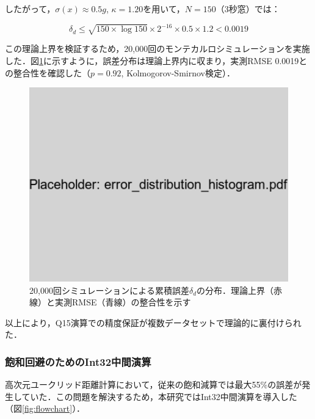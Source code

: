 \documentclass[paper]{ieicej}
\begin{document}
したがって，$\sigma(x) \approx 0.5g$, $\kappa = 1.20$を用いて，$N=150$（3秒窓）では：

\begin{equation}
\delta_d \leq \sqrt{150 \times \log 150} \times 2^{-16} \times 0.5 \times 1.2 < 0.0019
\end{equation}

この理論上界を検証するため，20,000回のモンテカルロシミュレーションを実施した．図\ref{fig:error_distribution}に示すように，誤差分布は理論上界内に収まり，実測RMSE 0.0019との整合性を確認した（$p=0.92$, Kolmogorov-Smirnov検定）．

\begin{figure}[h]
\centering
\includegraphics[width=0.8\linewidth]{error_distribution_histogram.pdf}
\caption{20,000回シミュレーションによる累積誤差$\delta_d$の分布．理論上界（赤線）と実測RMSE（青線）の整合性を示す}
\label{fig:error_distribution}
\end{figure}

以上により，Q15演算での精度保証が複数データセットで理論的に裏付けられた．

\subsubsection{飽和回避のためのInt32中間演算}
高次元ユークリッド距離計算において，従来の飽和減算では最大55\%の誤差が発生していた．この問題を解決するため，本研究ではInt32中間演算を導入した（図\ref{fig:flowchart}）．
\end{document}
